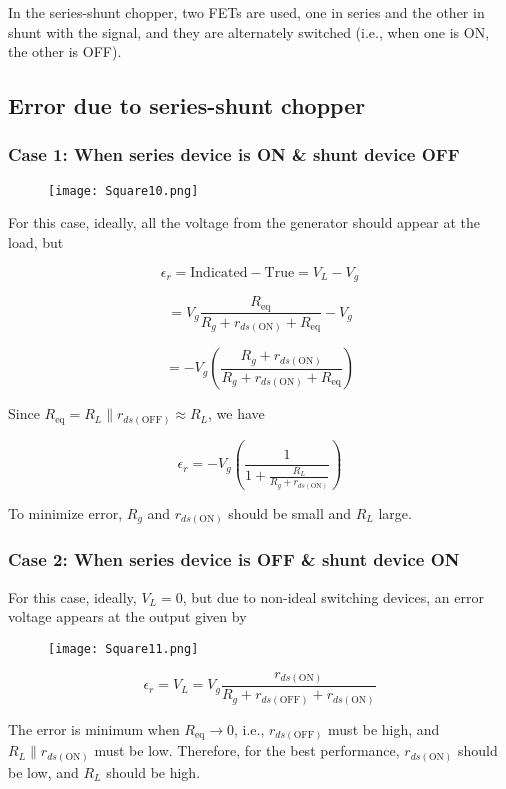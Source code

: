 \documentclass[a4paper,9pt,twoside,openany,twocolumn]{memoir}
\begin{document}
In the series-shunt chopper, two FETs are used, one in series and the other in shunt with the signal, and they are alternately switched (i.e., when one is ON, the other is OFF).

\subsection*{Error due to series-shunt chopper}

\subsubsection*{Case 1: When series device is ON \& shunt device OFF}
\begin{figure}[h]
    \centering
    \texttt{[image: Square10.png]}
    \caption{}
\end{figure}
For this case, ideally, all the voltage from the generator should appear at the load, but

\[
\epsilon_r = \text{Indicated} - \text{True} = V_L - V_g
\]

\[
= V_g \frac{R_{\text{eq}}}{R_g + r_{ds(\text{ON})} + R_{\text{eq}}} - V_g
\]

\[
= -V_g \left( \frac{R_g + r_{ds(\text{ON})}}{R_g + r_{ds(\text{ON})} + R_{\text{eq}}} \right)
\]

Since $R_{\text{eq}} = R_L \parallel r_{ds(\text{OFF})} \approx R_L$, we have

\[
\epsilon_r = -V_g \left( \frac{1}{1 + \frac{R_L}{R_g + r_{ds(\text{ON})}}} \right)
\]

To minimize error, $R_g$ and $r_{ds(\text{ON})}$ should be small and $R_L$ large.

\subsubsection*{Case 2: When series device is OFF \& shunt device ON}
For this case, ideally, $V_L = 0$, but due to non-ideal switching devices, an error voltage appears at the output given by
\begin{figure}[h]
    \centering
    \texttt{[image: Square11.png]}
    \caption{}
\end{figure}
\[
\epsilon_r = V_L = V_g \frac{r_{ds(\text{ON})}}{R_g + r_{ds(\text{OFF})} + r_{ds(\text{ON})}}
\]

The error is minimum when $R_{\text{eq}} \to 0$, i.e., $r_{ds(\text{OFF})}$ must be high, and $R_L \parallel r_{ds(\text{ON})}$ must be low. Therefore, for the best performance, $r_{ds(\text{ON})}$ should be low, and $R_L$ should be high.
\end{document}
